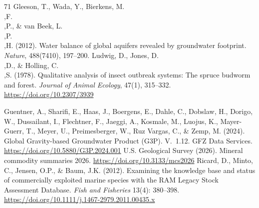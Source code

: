 \documentclass[twocolumn,10pt]{article}
\begin{document}
\begin{thebibliography}{71}
 Gleeson, T., Wada, Y., Bierkens, M.\\,F.\\,P., \& van Beek, L.\\,P.\\,H. (2012). Water balance of global aquifers revealed by groundwater footprint. \textit{Nature}, 488(7410), 197--200.
 Ludwig, D., Jones, D.\\,D., \& Holling, C.\\,S. (1978). Qualitative analysis of insect outbreak systems: The spruce budworm and forest. \textit{Journal of Animal Ecology}, 47(1), 315--332. \url{https://doi.org/10.2307/3939}


 Guentner, A., Sharifi, E., Haas, J., Boergens, E., Dahle, C., Dobslaw, H., Dorigo, W., Dussailant, I., Flechtner, F., Jaeggi, A., Kosmale, M., Luojus, K., Mayer-Guerr, T., Meyer, U., Preimesberger, W., Ruz Vargas, C., \& Zemp, M. (2024). Global Gravity-based Groundwater Product (G3P). V.~1.12. GFZ Data Services. \url{https://doi.org/10.5880/G3P.2024.001}
 U.S. Geological Survey (2026). Mineral commodity summaries 2026. \url{https://doi.org/10.3133/mcs2026}
 Ricard, D., Minto, C., Jensen, O.P., \& Baum, J.K. (2012). Examining the knowledge base and status of commercially exploited marine species with the RAM Legacy Stock Assessment Database. \textit{Fish and Fisheries} 13(4): 380--398. \url{https://doi.org/10.1111/j.1467-2979.2011.00435.x}

\end{thebibliography}

\appendix
\end{document}
